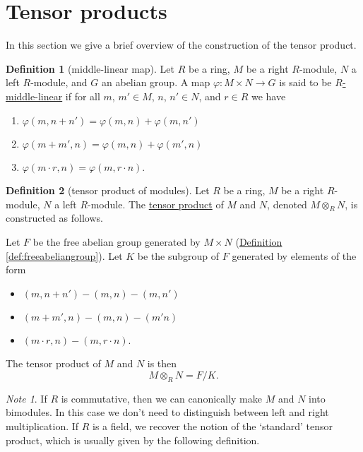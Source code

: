 \documentclass[a4paper,10pt]{scrreprt}
\newcommand{\defn}[1]{\ul{#1}}
\theoremstyle{definition}
\newtheorem{definition}{Definition}[section]
\theoremstyle{plain}
\theoremstyle{remark}
\newtheorem{note}{Note}[section]
\begin{document}
\section{Tensor products}
In this section we give a brief overview of the construction of the tensor product.

\begin{definition}[middle-linear map]
  \label{def:middlelinearmap}
  Let $R$ be a ring, $M$ be a right $R$-module, $N$ a left $R$-module, and $G$ an abelian group. A map $\varphi\colon M \times N \to G$ is said to be \defn{$R$-middle-linear} if for all $m$, $m' \in M$, $n$, $n' \in N$, and $r \in R$ we have
  \begin{enumerate}
    \item $\varphi(m, n + n') = \varphi(m, n) + \varphi(m, n')$
    \item $\varphi(m + m', n) = \varphi(m, n) + \varphi(m', n)$
    \item $\varphi(m \cdot r, n) = \varphi(m, r \cdot n)$.
  \end{enumerate}
\end{definition}

\begin{definition}[tensor product of modules]
  \label{def:tensorproductofmodules}
  Let $R$ be a ring, $M$ be a right $R$-module, $N$ a left $R$-module. The \defn{tensor product} of $M$ and $N$, denoted $M \otimes_{R} N$, is constructed as follows.

  Let $F$ be the free abelian group generated by $M \times N$ (\hyperref[def:freeabeliangroup]{Definition \ref*{def:freeabeliangroup}}). Let $K$ be the subgroup of $F$ generated by elements of the form
  \begin{itemize}
    \item $(m, n + n') - (m, n) - (m, n')$
    \item $(m + m', n) - (m, n) - (m' n)$
    \item $(m \cdot r, n) - (m, r \cdot n)$.
  \end{itemize}

  The tensor product of $M$ and $N$ is then
  \begin{equation*}
    M \otimes_{R} N = F / K.
  \end{equation*}
\end{definition}

\begin{note}
  If $R$ is commutative, then we can canonically make $M$ and $N$ into bimodules. In this case we don't need to distinguish between left and right multiplication. If $R$ is a field, we recover the notion of the `standard' tensor product, which is usually given by the following definition.
\end{note}
\end{document}
